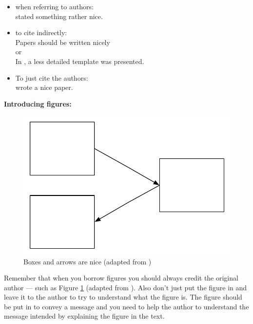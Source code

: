 \documentclass[a4paper]{book}
\begin{document}
\begin{itemize}
    \item when referring to authors:\\
          \citet{authorson10:_secon_best_paper_in_world} stated something rather nice.
    \item to cite indirectly: \\
          Papers should be written nicely \citep{authorson10:_secon_best_paper_in_world}\\
          or\\
          In \cite{authorson10:_secon_best_paper_in_world}, a less detailed template was presented.
    \item To just cite the authors: \\
          \citeauthor{authorson10:_secon_best_paper_in_world} wrote a nice paper.
\end{itemize}

\vspace{0.5cm}

\noindent
{\bf Introducing figures:} \\

\begin{figure}[ht]
    \begin{center}
        \includegraphics[width=0.5\columnwidth]{figs/figure1.pdf}
        \caption[Boxes and arrows are nice]{Boxes and arrows are nice (adapted from \citet{authorson10:_secon_best_paper_in_world})}
        \label{fig:BoxesAndArrowsAreNice}
    \end{center}
\end{figure}

Remember that when you borrow figures you should always credit the original author --- such as Figure \ref{fig:BoxesAndArrowsAreNice} (adapted from \citet{authorson10:_secon_best_paper_in_world}). Also don't just put the figure in and leave it to the author to try to understand what the figure is. The figure should be put in to convey a message and you need to help the author to understand the message intended by explaining the figure in the text.
\end{document}
